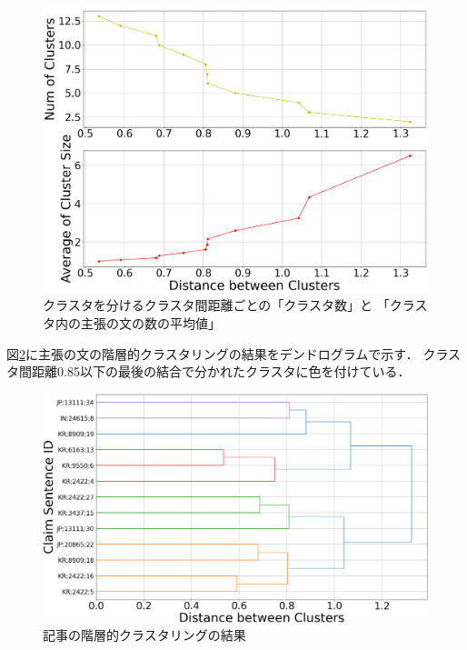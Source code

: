 \documentclass[12pt,a4j,dvipdfmx]{jreport}
\begin{document}
\begin{figure}[H]
	\centering
	\includegraphics[keepaspectratio, width=120mm]{img/process-07_sentences-cluster_from-cluster-230_with-threshold-85_threshold-dependencies_reduced-data-to-5000_Trim.png}
	\caption{クラスタを分けるクラスタ間距離ごとの「クラスタ数」と
  「クラスタ内の主張の文の数の平均値」}
	\label{num_and_size_of_clusters_of_sentences}
\end{figure}

\newpage

図\ref{sentences_dendrogram}に主張の文の階層的クラスタリングの結果をデンドログラムで示す．
クラスタ間距離0.85以下の最後の結合で分かれたクラスタに色を付けている．

\begin{figure}[H]
	\centering
	\includegraphics[keepaspectratio, width=120mm]{img/process-07_sentences-cluster_from-cluster-230_with-threshold-85_color_dendrogram_reduced-data-to-5000_y-120_Trim.png}
	\caption{記事の階層的クラスタリングの結果}
	\label{sentences_dendrogram}
\end{figure}
\end{document}
